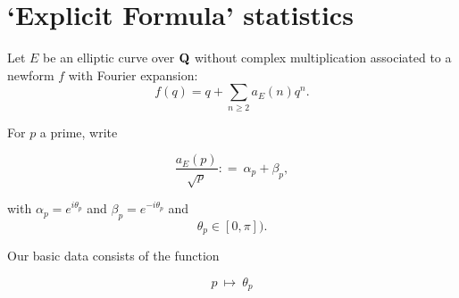 \documentclass[11pt]{article}
\theoremstyle{plain}
\theoremstyle{definition}
\numberwithin{equation}{section}
\numberwithin{figure}{section}
\numberwithin{table}{section}
\def\Q{\bf{Q}}
\begin{document}

 \section{`Explicit Formula' statistics}

Let $E$ be an elliptic curve over ${\Q}$ without complex multiplication associated to a newform $f$ with Fourier expansion:
$$f(q) = q+\sum_{n\ge 2}a_E(n)q^n.$$

For $p$ a prime, write

\begin{equation}
{\frac{a_E(p)}{\sqrt p}}: = \   \alpha_p+\beta_p,
\end{equation}

with $\alpha_p= e^{i\theta_p}$ and  $\beta_p= e^{-i\theta_p}$
and
\begin{equation}
\theta_p \in [0, \pi]).
\end{equation}


Our basic data consists of the function

\begin{equation}\label{data}
p \ \mapsto\ \theta_p
\end{equation}
\end{document}

